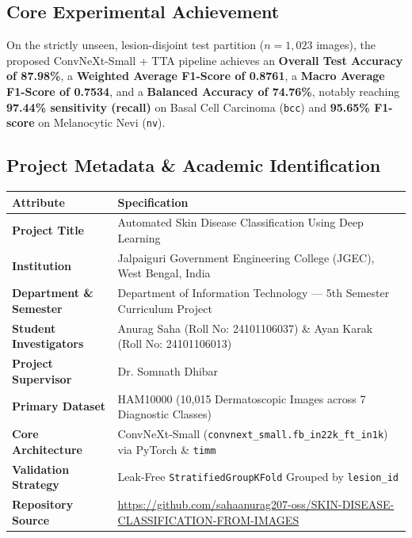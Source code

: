 \documentclass[12pt,a4paper]{article}
\begin{document}
\subsection*{Core Experimental Achievement}
On the strictly unseen, lesion-disjoint test partition ($n = 1,023$ images), the proposed ConvNeXt-Small + TTA pipeline achieves an \textbf{Overall Test Accuracy of 87.98\%}, a \textbf{Weighted Average F1-Score of 0.8761}, a \textbf{Macro Average F1-Score of 0.7534}, and a \textbf{Balanced Accuracy of 74.76\%}, notably reaching \textbf{97.44\% sensitivity (recall)} on Basal Cell Carcinoma (\texttt{bcc}) and \textbf{95.65\% F1-score} on Melanocytic Nevi (\texttt{nv}).

\subsection{Project Metadata \& Academic Identification}
\begin{table}[h!]
\centering
\renewcommand{\arraystretch}{1.25}
\begin{tabularx}{\textwidth}{>{\bfseries}l X}
\toprule
Attribute & Specification \\
\midrule
Project Title & Automated Skin Disease Classification Using Deep Learning \\
Institution & Jalpaiguri Government Engineering College (JGEC), West Bengal, India \\
Department \& Semester & Department of Information Technology --- 5th Semester Curriculum Project \\
Student Investigators & Anurag Saha (Roll No: 24101106037) \& Ayan Karak (Roll No: 24101106013) \\
Project Supervisor & Dr. Somnath Dhibar \\
Primary Dataset & HAM10000 (10,015 Dermatoscopic Images across 7 Diagnostic Classes) \\
Core Architecture & ConvNeXt-Small (\texttt{convnext\_small.fb\_in22k\_ft\_in1k}) via PyTorch \& \texttt{timm} \\
Validation Strategy & Leak-Free \texttt{StratifiedGroupKFold} Grouped by \texttt{lesion\_id} \\
Repository Source & \url{https://github.com/sahaanurag207-oss/SKIN-DISEASE-CLASSIFICATION-FROM-IMAGES} \\
\bottomrule
\end{tabularx}
\end{table}
\end{document}
